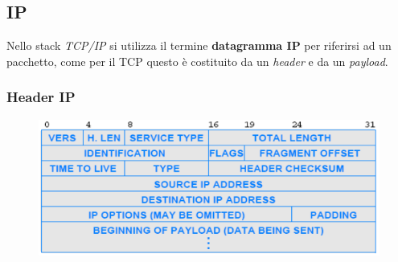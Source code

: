 \documentclass{article}
\begin{document}
        \subsection{IP}
            Nello stack \textit{TCP/IP} si utilizza il termine \textbf{datagramma IP} per riferirsi ad un pacchetto, come per il TCP questo è costituito da un \textit{header} e da un \textit{payload}.

            \subsubsection{Header IP}
                \begin{figure}[H]
                    \centering
                    \includegraphics[width=\textwidth]{pic/header_ip.png}
                    \label{Header IP}
                \end{figure}
\end{document}
